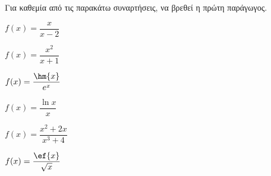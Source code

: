 Για καθεμία από τις παρακάτω συναρτήσεις, να βρεθεί η πρώτη παράγωγος.
\begin{multicols}{2}
\begin{alist}
\item $ f(x)=\dfrac{x}{x-2} $
\item $ f(x)=\dfrac{x^2}{x+1} $
\item $ f(x)=\dfrac{\hm{x}}{e^x} $
\item $ f(x)=\dfrac{\ln{x}}{x} $
\item $ f(x)=\dfrac{x^2+2x}{x^3+4} $
\item $ f(x)=\dfrac{\ef{x}}{\sqrt{x}} $
\end{alist}
\end{multicols}

